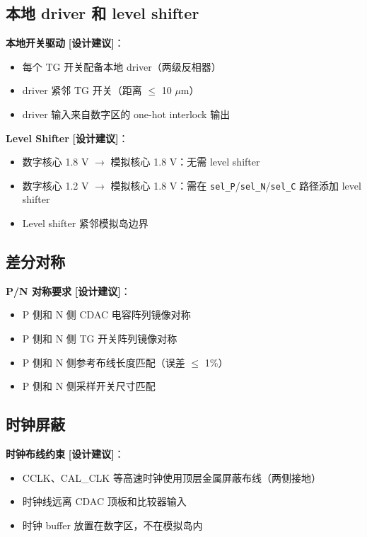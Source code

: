 \documentclass[UTF8,a4paper,11pt]{ctexart}
\newcommand{\suggested}{\textcolor{suggestblue}{\textbf{[设计建议]}}}
\providecommand{\textmu}{\ensuremath{\mu}}
\begin{document}
\subsection{本地 driver 和 level shifter}

\textbf{本地开关驱动} \suggested：
\begin{itemize}[leftmargin=2em]
\item 每个 TG 开关配备本地 driver（两级反相器）
\item driver 紧邻 TG 开关（距离 $\leq$ 10 \textmu m）
\item driver 输入来自数字区的 one-hot interlock 输出
\end{itemize}

\textbf{Level Shifter} \suggested：
\begin{itemize}[leftmargin=2em]
\item 数字核心 1.8 V $\rightarrow$ 模拟核心 1.8 V：无需 level shifter
\item 数字核心 1.2 V $\rightarrow$ 模拟核心 1.8 V：需在 \texttt{sel\_P}/\texttt{sel\_N}/\texttt{sel\_C} 路径添加 level shifter
\item Level shifter 紧邻模拟岛边界
\end{itemize}

\subsection{差分对称}

\textbf{P/N 对称要求} \suggested：
\begin{itemize}[leftmargin=2em]
\item P 侧和 N 侧 CDAC 电容阵列镜像对称
\item P 侧和 N 侧 TG 开关阵列镜像对称
\item P 侧和 N 侧参考布线长度匹配（误差 $\leq$ 1\%）
\item P 侧和 N 侧采样开关尺寸匹配
\end{itemize}

\subsection{时钟屏蔽}

\textbf{时钟布线约束} \suggested：
\begin{itemize}[leftmargin=2em]
\item CCLK、CAL\_CLK 等高速时钟使用顶层金属屏蔽布线（两侧接地）
\item 时钟线远离 CDAC 顶板和比较器输入
\item 时钟 buffer 放置在数字区，不在模拟岛内
\end{itemize}
\end{document}
